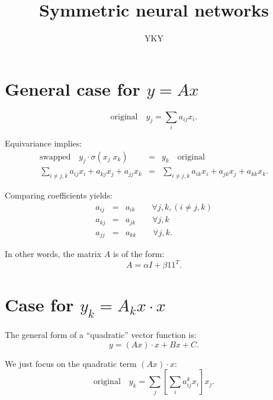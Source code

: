 

\title{Symmetric neural networks}
\author{YKY}


\maketitle

\section{General case for $y = A x$}

\begin{equation}
\boxed{\mbox{original}} \quad y_j = \sum_i a_{ij} x_i .
\end{equation}

Equivariance implies:
\begin{eqnarray}
\boxed{\mbox{swapped}} \quad y_j \cdot \sigma(x_j \; x_k) &=& y_k \quad \boxed{\mbox{original}} \\
\sum_{i \neq j,k} a_{ij} x_i + a_{kj} x_j + a_{jj} x_k &=& \sum_{i \neq j,k} a_{ik} x_i + a_{jk} x_j + a_{kk} x_k . \nonumber
\end{eqnarray}


Comparing coefficients yields:
\begin{eqnarray}
a_{ij} &=& a_{ik} \quad \quad \forall j, k, (i \neq j, k) \nonumber \\
a_{kj} &=& a_{jk} \quad \quad \forall j, k \nonumber \\
a_{jj} &=& a_{kk} \quad \quad \forall j, k .
\end{eqnarray}

In other words, the matrix $A$ is of the form:
\begin{equation}
A = \alpha I + \beta 1 1^T .
\end{equation}

\section{Case for $y_k = A_k x \cdot x$}

The general form of a ``quadratic'' vector function is:
\begin{equation}
y = (A x) \cdot x + B x + C .
\end{equation}

We just focus on the quadratic term $(A x) \cdot x$:
\begin{equation}
\boxed{\mbox{original}} \quad y_k = \sum_j \left[ \sum_i a_{ij}^k x_i \right] x_j .
\end{equation}

